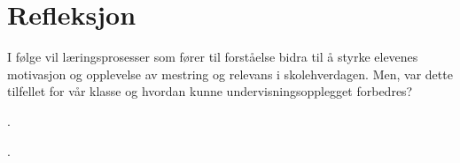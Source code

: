 \documentclass[main.tex]{subfiles}
\begin{document}
\section*{Refleksjon}
\label{sec:3}
I følge  vil læringsprosesser som fører til forståelse bidra til å styrke elevenes motivasjon og 
opplevelse av mestring og relevans i skolehverdagen. Men, var dette tilfellet for vår klasse og hvordan
kunne undervisningsopplegget forbedres?

.



.

\end{document}
